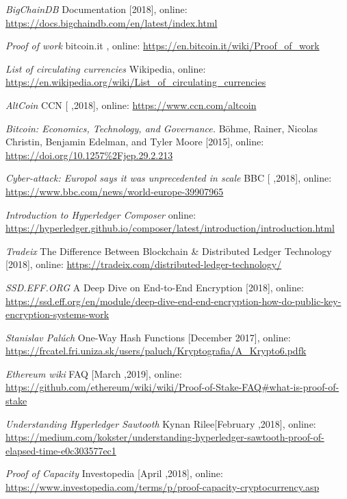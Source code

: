 \begin{thebibliography}{99}
\textit{BigChainDB}  Documentation [2018], online: 
\url{https://docs.bigchaindb.com/en/latest/index.html}

\textit{Proof of work} bitcoin.it , online: 
\url{https://en.bitcoin.it/wiki/Proof_of_work}

\textit{List of circulating currencies} Wikipedia, online: 
\url{https://en.wikipedia.org/wiki/List_of_circulating_currencies}

\textit{AltCoin} CCN [ ,2018], online: 
\url{https://www.ccn.com/altcoin}

\textit{Bitcoin: Economics, Technology, and Governance.} Böhme, Rainer, Nicolas Christin, Benjamin Edelman, and Tyler Moore [2015], online: 
\url{https://doi.org/10.1257\%2Fjep.29.2.213}

\textit{Cyber-attack: Europol says it was unprecedented in scale} BBC [ ,2018], online: 
\url{https://www.bbc.com/news/world-europe-39907965}

\textit{Introduction to Hyperledger Composer} online: 
\url{https://hyperledger.github.io/composer/latest/introduction/introduction.html}

\textit{Tradeix} The Difference Between Blockchain & Distributed Ledger Technology [2018], online: 
\url{https://tradeix.com/distributed-ledger-technology/}


\textit{SSD.EFF.ORG} A Deep Dive on End-to-End Encryption [2018], online: 
\url{https://ssd.eff.org/en/module/deep-dive-end-end-encryption-how-do-public-key-encryption-systems-work}

\textit{Stanislav Palúch} One-Way Hash Functions [December 2017], online: 
\url{https://frcatel.fri.uniza.sk/users/paluch/Kryptografia/A_Krypto6.pdfk}

\textit{Ethereum wiki} FAQ [March ,2019], online: 
\url{https://github.com/ethereum/wiki/wiki/Proof-of-Stake-FAQ#what-is-proof-of-stake}

\textit{Understanding Hyperledger Sawtooth} Kynan Rilee[February ,2018], online: 
\url{https://medium.com/kokster/understanding-hyperledger-sawtooth-proof-of-elapsed-time-e0c303577ec1}

\textit{Proof of Capacity} Investopedia [April ,2018], online: 
\url{https://www.investopedia.com/terms/p/proof-capacity-cryptocurrency.asp}



\end{thebibliography}

